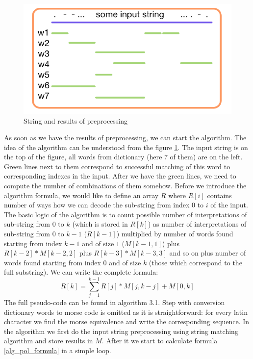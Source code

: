\documentclass[a4paper]{article}
\begin{document}
\begin{figure}[ht!]
	\center
	\includegraphics[width=0.8\linewidth]{string_interp.png}
	\caption{String and results of preprocessing}
	\label{preprocessing}
\end{figure}
As soon as we have the results of preprocessing, we can start the algorithm. The idea of the algorithm can be understood from the figure \ref{preprocessing}. The input string is on the top of the figure, all words from dictionary (here 7 of them) are on the left. Green lines next to them correspond to successful matching of this word to corresponding indexes in the input. After we have the green lines, we need to compute the number of combinations of them somehow. Before we introduce the algorithm formula, we would like to define an array $R$ where $R[i]$ contains number of ways how we can decode the sub-string from index $0$ to $i$ of the input. The basic logic of the algorithm is to count possible number of interpretations of sub-string from $0$ to $k$ (which is stored in $R[k]$) as number of interpretations of sub-string from $0$ to $k-1$ ($R[k-1]$) multiplied by number of words found starting from index $k-1$ and of size $1$ ($M[k-1, 1]$) plus $R[k-2] * M[k-2, 2]$ plus $R[k-3] * M[k-3, 3]$ and so on plus number of words found starting from index $0$ and of size $k$ (those which correspond to the full substring). We can write the complete formula:
\begin{equation}
\label{alg_pol_formula}
R[k] = \sum_{j=1}^{k-1}{R[j] * M[j, k-j]} + M[0, k]
\end{equation}
The full pseudo-code can be found in algorithm 3.1. Step with conversion dictionary words to morse code is omitted as it is straightforward: for every latin character we find the morse equivalence and write the corresponding sequence. In the algorithm we first do the input string preprocessing using string matching algorithm and store results in $M$. After it we start to calculate formula \ref{alg_pol_formula} in a simple loop.
\end{document}
